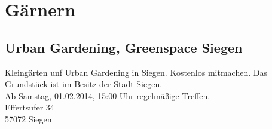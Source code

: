 \chapter{Gärnern}  

\section{Urban Gardening, Greenspace Siegen}
Kleingärten unf Urban Gardening in Siegen. Kostenlos mitmachen. Das Grundstück ist im Besitz der Stadt Siegen.\\
Ab Samstag, 01.02.2014, 15:00 Uhr regelmäßige Treffen.\\
Effertsufer 34\\
57072 Siegen